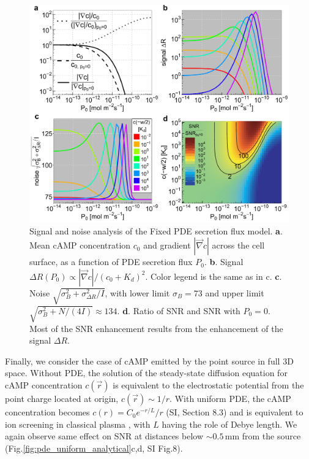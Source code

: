 \documentclass[%
 reprint,
 amsmath,amssymb,
 aps,prl,
 showpacs,
 linenumbers
]{revtex4-1}
\begin{document}
\begin{figure}[t]
	\centering
	\includegraphics[scale=0.245]{../figures/fig3_pde_flux_plots}
	\caption{
		\linespread{1.0}
		Signal and noise analysis of the Fixed PDE secretion flux model.
		\textbf{a}. Mean cAMP concentration $c_0$ and gradient $|\vec{\nabla}c|$ across the cell surface, as a function of PDE secretion flux $P_0$. 
		\textbf{b}. Signal $\Delta R(P_0) \propto |\vec{\nabla}c|/(c_0 + K_d)^2$. Color legend is the same as in c.
		\textbf{c}. Noise $\sqrt{\sigma_B^2 + \sigma_{\Delta R}^2/I}$, with lower limit $\sigma_B = 73$ and upper limit $\sqrt{\sigma_B^2 + N/(4I)} \approx 134$. 
		\textbf{d}. Ratio of SNR and SNR with $P_0 = 0$. Most of the SNR enhancement results from the enhancement of the signal $\Delta R$. 
	}
	\label{fig:pde_flux_signal_noise}
\end{figure}

Finally, we consider the case of cAMP emitted by the point source in full 3D space. Without PDE, the solution of the steady-state diffusion equation for cAMP concentration $c(\vec{r})$ is equivalent to the electrostatic potential from the point charge located at origin, $c(\vec{r}) \sim 1/r$. With uniform PDE, the cAMP concentration becomes $c(r) = C_0 e^{-r/L}/r$ (SI, Section 8.3) and is equivalent to ion screening in classical plasma \cite{screening}, with $L$ having the role of Debye length. We again observe same effect on SNR at distances below $\sim 0.5\,\mathrm{mm}$ from the source (Fig.\ref{fig:pde_uniform_analytical}c,d, SI Fig.8).
\end{document}
